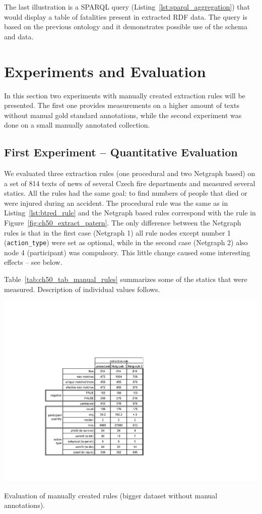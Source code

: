 The last illustration is a SPARQL query (Listing~\ref{lst:sparql_aggregation}) that would display a table of fatalities present in extracted RDF data. The query is based on the previous ontology and it demonstrates possible use of the schema and data.


\section{Experiments and Evaluation}


In this section two experiments with manually created extraction rules will be presented. The first one provides measurements on a higher amount of texts without manual gold standard annotations, while the second experiment was done on a small manually annotated collection. 

\subsection{First Experiment -- Quantitative Evaluation}

We evaluated three extraction rules (one procedural and two Netgraph based) on a set of 814 texts of news of several Czech fire departments and measured several statics. All the rules had the same goal: to find numbers of people that died or were injured during an accident. The procedural rule was the same as in Listing~\ref{lst:btred_rule} and the Netgraph based rules correspond with the rule in Figure~\ref{fig:ch50_extract_patern}. The only difference between the Netgraph rules is that in the first case (Netgraph 1) all rule nodes except number 1 (\verb+action_type+) were set as optional, while in the second case (Netgraph 2) also node 4 (participant) was compulsory. This little change caused some interesting effects -- see below. 

Table~\ref{tab:ch50_tab_manual_rules} summarizes some of the statics that were measured. Description of individual values follows.

\begin{table}
	\centering
		\includegraphics[angle=-90,width=0.6\hsize]{tab_manual_rules}
	\caption{Evaluation of manually created rules (bigger dataset without manual annotations).}
	\label{tab:ch50_tab_manual_rules}
\end{table}


